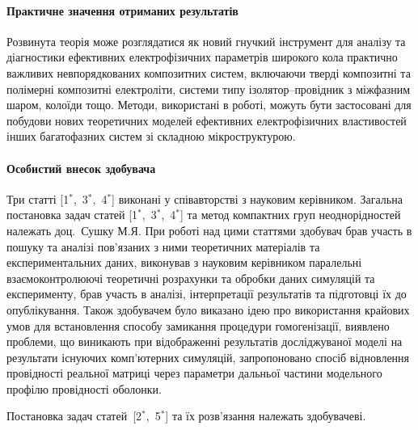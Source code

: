 \paragraph{Практичне значення отриманих результатів}\hfill\par
Розвинута теорія може розглядатися як новий 
гнучкий інструмент для аналізу та діагностики ефективних 
електрофізичних параметрів широкого кола практично важливих невпорядкованих композитних систем, включаючи
тверді композитні та полімерні композитні електроліти, 
системи типу ізолятор--провідник з міжфазним шаром, колоїди тощо. 
Методи, використані в роботі, можуть бути застосовані
для побудови нових теоретичних моделей ефективних електрофізичних властивостей інших багатофазних систем зі складною мікроструктурою.



\paragraph{Особистий внесок здобувача}\hfill\par
Три статті [1$^*$,~3$^*$,~4$^*$] виконані у співавторстві з науковим керівником. Загальна постановка задач статей [1$^*$,~3$^*$,~4$^*$] та метод компактних груп неоднорідностей належать доц.~Сушку М.Я. При роботі над цими статтями здобувач брав участь в пошуку та аналізі пов'язаних з ними теоретичних матеріалів та експериментальних даних, виконував з науковим керівником паралельні взаємоконтролюючі теоретичні розрахунки та обробки даних симуляцій та експерименту, брав участь в аналізі, інтерпретації результатів та підготовці їх до опублікування. Також здобувачем було виказано ідею про використання крайових умов для встановлення способу замикання процедури гомогенізації, виявлено проблеми, що виникають при відображенні результатів досліджуваної моделі на результати існуючих комп'ютерних симуляцій, запропоновано спосіб відновлення провідності реальної матриці через параметри дальньої частини модельного профілю провідності оболонки.

Постановка задач статей~[2$^*$,~5$^*$] та їх розв'язання належать здобувачеві.




